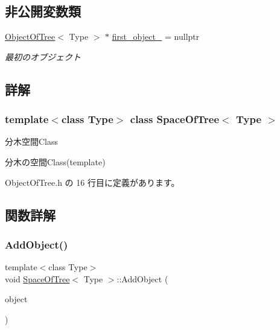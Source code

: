 \subsection*{非公開変数類}
\begin{DoxyCompactItemize}
\item 
\mbox{\hyperlink{class_object_of_tree}{Object\+Of\+Tree}}$<$ Type $>$ $\ast$ \mbox{\hyperlink{class_space_of_tree_af47684080d10ec625f1ebbf6492bf99a}{first\+\_\+object\+\_\+}} = nullptr
\begin{DoxyCompactList}\small\item\em 最初のオブジェクト \end{DoxyCompactList}\end{DoxyCompactItemize}


\subsection{詳解}
\subsubsection*{template$<$class Type$>$\newline
class Space\+Of\+Tree$<$ Type $>$}

分木空間\+Class 

分木の空間\+Class(template) 

 Object\+Of\+Tree.\+h の 16 行目に定義があります。



\subsection{関数詳解}
\mbox{\label{class_space_of_tree_a8156722056d7b2ab354ff22235772d7e}} 
\subsubsection{\texorpdfstring{Add\+Object()}{AddObject()}}
{\footnotesize\ttfamily template$<$class Type$>$ \\
void \mbox{\hyperlink{class_space_of_tree}{Space\+Of\+Tree}}$<$ Type $>$\+::Add\+Object (\begin{DoxyParamCaption}\item[{\mbox{\hyperlink{class_object_of_tree}{Object\+Of\+Tree}}$<$ Type $>$ $\ast$}]{object }\end{DoxyParamCaption})\hspace{0.3cm}{\ttfamily [inline]}}



